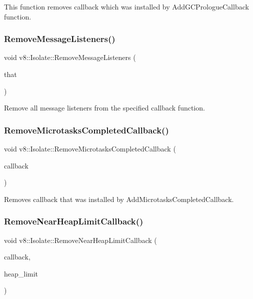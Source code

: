 This function removes callback which was installed by Add\+G\+C\+Prologue\+Callback function. \mbox{\label{classv8_1_1Isolate_a0319e55b26ba3ac51d867b37b917a21f}} 
\subsubsection{\texorpdfstring{Remove\+Message\+Listeners()}{RemoveMessageListeners()}}
{\footnotesize\ttfamily void v8\+::\+Isolate\+::\+Remove\+Message\+Listeners (\begin{DoxyParamCaption}\item[{Message\+Callback}]{that }\end{DoxyParamCaption})}

Remove all message listeners from the specified callback function. \mbox{\label{classv8_1_1Isolate_a0fdc58db0d44c5a8f427d809e1c0b604}} 
\subsubsection{\texorpdfstring{Remove\+Microtasks\+Completed\+Callback()}{RemoveMicrotasksCompletedCallback()}}
{\footnotesize\ttfamily void v8\+::\+Isolate\+::\+Remove\+Microtasks\+Completed\+Callback (\begin{DoxyParamCaption}\item[{Microtasks\+Completed\+Callback}]{callback }\end{DoxyParamCaption})}

Removes callback that was installed by Add\+Microtasks\+Completed\+Callback. \mbox{\label{classv8_1_1Isolate_a2f3f09c0e4d5d316d6035a1d75add7ed}} 
\subsubsection{\texorpdfstring{Remove\+Near\+Heap\+Limit\+Callback()}{RemoveNearHeapLimitCallback()}}
{\footnotesize\ttfamily void v8\+::\+Isolate\+::\+Remove\+Near\+Heap\+Limit\+Callback (\begin{DoxyParamCaption}\item[{\mbox{\hyperlink{namespacev8_af4357cae607e45cd9e9c4fda1cc03218}{Near\+Heap\+Limit\+Callback}}}]{callback,  }\item[{size\+\_\+t}]{heap\+\_\+limit }\end{DoxyParamCaption})}

